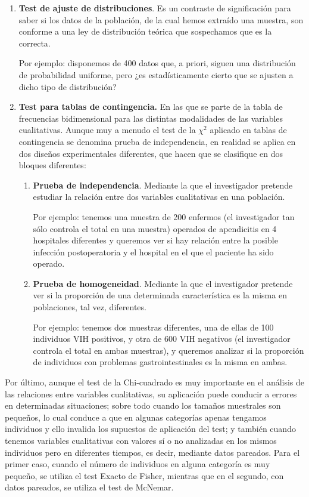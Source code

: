 \begin{enumerate}
\item \textbf{Test de ajuste de distribuciones}. Es un contraste de significación para saber si los datos de la población, de la cual hemos
extraído una muestra, son conforme a una ley de distribución teórica que sospechamos que es la correcta.

Por ejemplo: disponemos de 400 datos que, a priori, siguen una distribución de probabilidad uniforme, pero ¿es estadísticamente cierto que
se ajusten a dicho tipo de distribución?

\item \textbf{Test para tablas de contingencia.} En las que se parte de la tabla de frecuencias bidimensional para las distintas modalidades
de las variables cualitativas. Aunque muy a menudo el test de la $\chi^{2}$ aplicado en tablas de contingencia se denomina prueba de
independencia, en realidad se aplica en dos diseños experimentales diferentes, que hacen que se clasifique en dos bloques diferentes:

\begin{enumerate}
\item \textbf{Prueba de independencia}. Mediante la que el investigador pretende estudiar la relación entre dos variables cualitativas en
una población.

Por ejemplo: tenemos una muestra de 200 enfermos (el investigador tan sólo controla el total en una muestra) operados de apendicitis en 4
hospitales diferentes y queremos ver si hay relación entre la posible infección postoperatoria y el hospital en el que el paciente ha sido
operado.

\item \textbf{Prueba de homogeneidad}. Mediante la que el investigador pretende ver si la proporción de una determinada característica es la
misma en poblaciones, tal vez, diferentes.

Por ejemplo: tenemos dos muestras diferentes, una de ellas de 100 individuos VIH positivos, y otra de 600 VIH negativos (el investigador
controla el total en ambas muestras), y queremos analizar si la proporción de individuos con problemas gastrointestinales es la misma en
ambas.
\end{enumerate}
\end{enumerate}

Por último, aunque el test de la Chi-cuadrado es muy importante en el análisis de las relaciones entre variables cualitativas, su aplicación
puede conducir a errores en determinadas situaciones; sobre todo cuando los tamaños muestrales son pequeños, lo cual conduce a que en
algunas categorías apenas tengamos individuos y ello invalida los supuestos de aplicación del test; y también cuando tenemos variables
cualitativas con valores sí o no analizadas en los mismos individuos pero en diferentes tiempos, es decir, mediante datos pareados. Para el
primer caso, cuando el número de individuos en alguna categoría es muy pequeño, se utiliza el test Exacto de Fisher, mientras que en el
segundo, con datos pareados, se utiliza el test de McNemar.

